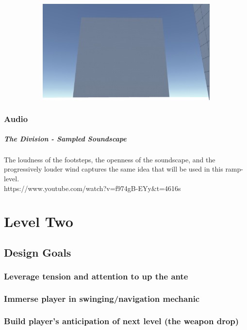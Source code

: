 \documentclass[letterpaper]{report}
\begin{document}
\begin{figure}[H]
\begin{subfigure}[h]{.32\linewidth}
					\end{subfigure}
					\begin{subfigure}[h]{.32\linewidth}
						\includegraphics[width=\linewidth]{level1-3}
					\end{subfigure}
				\end{figure}
				
			\subsection{Audio}
				\paragraph{The Division - Sampled Soundscape} The loudness of the footsteps, the openness of the soundscape, and the progressively louder wind captures the same idea that will be used in this ramp-level. \\ https://www.youtube.com/watch?v=f974gB-EYy\&t=4616s
				
	\chapter{Level Two}
		\section{Design Goals}
			\subsection{Leverage tension and attention to up the ante}
			\subsection{Immerse player in swinging/navigation mechanic}
			\subsection{Build player's anticipation of next level (the weapon drop)}
\end{document}
